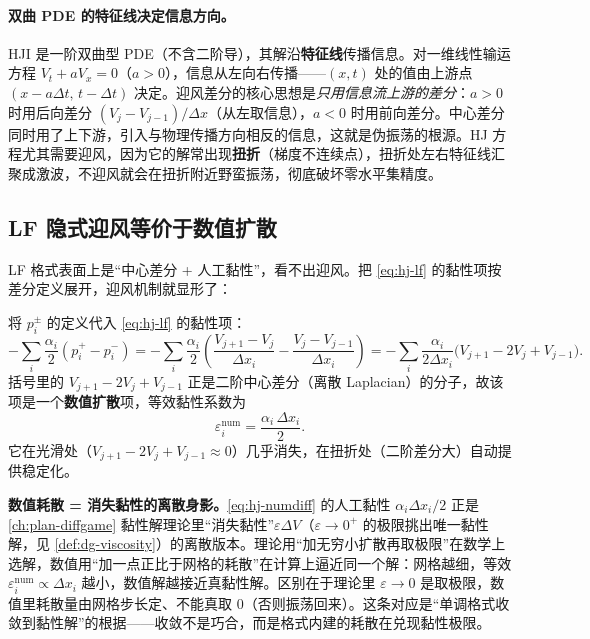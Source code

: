 \paragraph{双曲 PDE 的特征线决定信息方向。}
HJI 是一阶双曲型 PDE（不含二阶导），其解沿\textbf{特征线}传播信息。对一维线性输运方程 $V_t+aV_x=0$（$a>0$），信息从左向右传播——$(x,t)$ 处的值由上游点 $(x-a\Delta t,\,t-\Delta t)$ 决定。迎风差分的核心思想是\emph{只用信息流上游的差分}：$a>0$ 时用后向差分 $(V_j-V_{j-1})/\Delta x$（从左取信息），$a<0$ 时用前向差分。中心差分同时用了上下游，引入与物理传播方向相反的信息，这就是伪振荡的根源。HJ 方程尤其需要迎风，因为它的解常出现\textbf{扭折}（梯度不连续点），扭折处左右特征线汇聚成激波，不迎风就会在扭折附近野蛮振荡，彻底破坏零水平集精度。

\subsection{LF 隐式迎风等价于数值扩散}
\label{sec:hj-lf-diffusion}

LF 格式表面上是“中心差分 + 人工黏性”，看不出迎风。把 \cref{eq:hj-lf} 的黏性项按差分定义展开，迎风机制就显形了：

\begin{derivation}[LF 人工黏性的扩散形式]
将 $p_i^\pm$ 的定义代入 \cref{eq:hj-lf} 的黏性项：
\[
-\sum_i\frac{\alpha_i}{2}(p_i^+-p_i^-)
=-\sum_i\frac{\alpha_i}{2}\left(\frac{V_{j+1}-V_j}{\Delta x_i}-\frac{V_j-V_{j-1}}{\Delta x_i}\right)
=-\sum_i\frac{\alpha_i}{2\Delta x_i}\big(V_{j+1}-2V_j+V_{j-1}\big).
\]
括号里的 $V_{j+1}-2V_j+V_{j-1}$ 正是二阶中心差分（离散 Laplacian）的分子，故该项是一个\textbf{数值扩散}项，等效黏性系数为
\begin{equation}
  \varepsilon_i^{\mathrm{num}}=\frac{\alpha_i\,\Delta x_i}{2}.
  \label{eq:hj-numdiff}
\end{equation}
它在光滑处（$V_{j+1}-2V_j+V_{j-1}\approx0$）几乎消失，在扭折处（二阶差分大）自动提供稳定化。
\end{derivation}

\begin{insight}
\textbf{数值耗散 = 消失黏性的离散身影。}\;\cref{eq:hj-numdiff} 的人工黏性 $\alpha_i\Delta x_i/2$ 正是 \cref{ch:plan-diffgame} 黏性解理论里“消失黏性”$\varepsilon\Delta V$（$\varepsilon\to0^+$ 的极限挑出唯一黏性解，见 \cref{def:dg-viscosity}）的离散版本。理论用“加无穷小扩散再取极限”在数学上选解，数值用“加一点正比于网格的耗散”在计算上逼近同一个解：网格越细，等效 $\varepsilon_i^{\mathrm{num}}\propto\Delta x_i$ 越小，数值解越接近真黏性解。区别在于理论里 $\varepsilon\to0$ 是取极限，数值里耗散量由网格步长定、不能真取 $0$（否则振荡回来）。这条对应是“单调格式收敛到黏性解”的根据——收敛不是巧合，而是格式内建的耗散在兑现黏性极限。
\end{insight}

